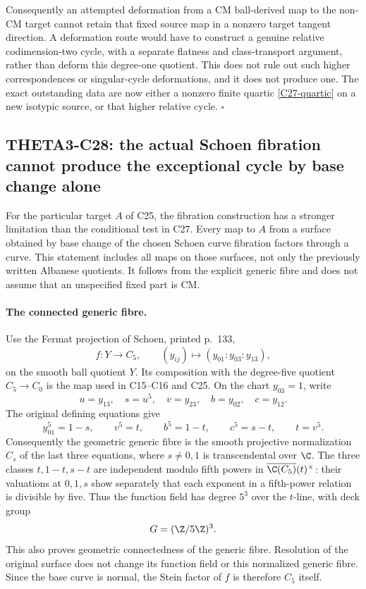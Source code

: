 \documentclass[11pt]{article}
\theoremstyle{definition}\newtheorem{definition}[theorem]{Definition}\newtheorem{remark}[theorem]{Remark}
\begin{document}
Consequently an attempted deformation from a CM
ball-derived map to the non-CM target cannot retain
that fixed source map in a nonzero target tangent
direction.  A deformation route would have to
construct a genuine relative codimension-two cycle,
with a separate flatness and class-transport argument,
rather than deform this degree-one quotient.  This
does not rule out such higher correspondences or
singular-cycle deformations, and it does not produce
one.  The exact outstanding data are now either
a nonzero finite quartic \eqref{C27-quartic} on a
new isotypic source, or that higher relative cycle.
\hfill$\square$


\subsection{THETA3-C28: the actual Schoen fibration cannot produce the exceptional cycle by base change alone}\label{C28}

For the particular target $A$ of C25, the fibration
construction has a stronger limitation than the conditional
test in C27.  Every map to $A$ from a surface obtained by
base change of the chosen Schoen curve fibration factors
through a curve.  This statement includes all maps on
those surfaces, not only the previously written Albanese
quotients.  It follows from the explicit generic fibre
and does not assume that an unspecified fixed part is CM.

\paragraph{The connected generic fibre.}
Use the Fermat projection of Schoen, printed p.~133,
\[
     f:Y\longrightarrow C_5,\qquad
             (y_{ij})\longmapsto(y_{01}:y_{03}:y_{13}),
\]
on the smooth ball quotient $Y$.  Its composition with
the degree-five quotient $C_5\to C_0$ is the map used
in C15--C16 and C25.  On the chart $y_{03}=1$, write
\[
 u=y_{13},\quad s=u^5,\quad v=y_{23},\quad
 b=y_{02},\quad c=y_{12}.
\]
The original defining equations give
\[
 y_{01}^5=1-s,\qquad
 v^5=t,\qquad b^5=1-t,\qquad c^5=s-t,
                  \qquad t=v^5.                 \tag{C28a}
\]
Consequently the geometric generic fibre is the smooth
projective normalization $C_s$ of the last three equations,
where $s\ne0,1$ is transcendental over $\C$.
The three classes $t,1-t,s-t$ are independent modulo fifth
powers in $\overline{\C(C_5)}(t)^\times$:
their valuations at $0,1,s$ show separately that each
exponent in a fifth-power relation is divisible by five.
Thus the function field has degree $5^3$ over the
$t$-line, with deck group
\[
                         G=(\Z/5\Z)^3.
\]
This also proves geometric connectedness of the generic
fibre.  Resolution of the original surface does not change
its function field or this normalized generic fibre.
Since the base curve is normal, the Stein factor of $f$
is therefore $C_5$ itself.
\end{document}

